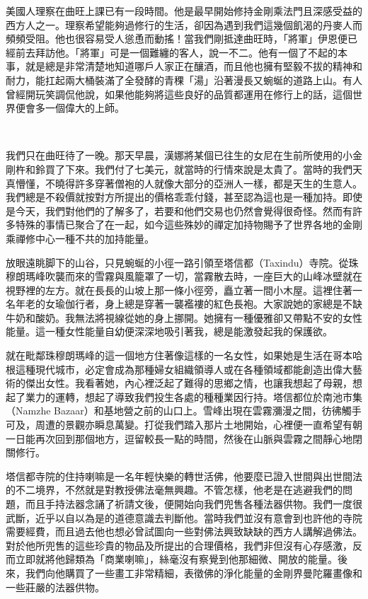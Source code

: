 美國人理察在曲旺上課已有一段時間。他是最早開始修持金剛乘法門且深感受益的西方人之一。理察希望能夠過修行的生活，卻因為遇到我們這幾個飢渴的丹麥人而頻頻受阻。他也很容易受人慫恿而動搖！當我們剛抵達曲旺時，「將軍」伊恩便已經前去拜訪他。「將軍」可是一個難纏的客人，說一不二。他有一個了不起的本事，就是總是非常清楚地知道哪戶人家正在釀酒，而且他也擁有堅毅不拔的精神和耐力，能扛起兩大桶裝滿了全發酵的青稞「湯」沿著漫長又蜿蜒的道路上山。有人曾經開玩笑調侃他說，如果他能夠將這些良好的品質都運用在修行上的話，這個世界便會多一個偉大的上師。

　

我們只在曲旺待了一晚。那天早晨，漢娜將某個已往生的女尼在生前所使用的小金剛杵和鈴買了下來。我們付了七美元，就當時的行情來說是太貴了。當時的我們天真懵懂，不曉得許多穿著僧袍的人就像大部分的亞洲人一樣，都是天生的生意人。我們總是不殺價就按對方所提出的價格乖乖付錢，甚至認為這也是一種加持。即使是今天，我們對他們的了解多了，若要和他們交易也仍然會覺得很奇怪。然而有許多特殊的事情已聚合了在一起，如今這些殊妙的禪定加持物賜予了世界各地的金剛乘禪修中心一種不共的加持能量。

放眼遠眺脚下的山谷，只見蜿蜒的小徑一路引領至塔信都（Taxindu）寺院。從珠穆朗瑪峰吹襲而來的雪霧與風籠罩了一切，當霧散去時，一座巨大的山峰冰壁就在視野裡的左方。就在長長的山坡上那一條小徑旁，矗立著一間小木屋。這裡住著一名年老的女瑜伽行者，身上總是穿著一襲襤褸的紅色長袍。大家說她的家總是不缺牛奶和酸奶。我無法將視線從她的身上挪開。她擁有一種優雅卻又帶點不安的女性能量。這一種女性能量自幼便深深地吸引著我，總是能激發起我的保護欲。

就在毗鄰珠穆朗瑪峰的這一個地方住著像這樣的一名女性，如果她是生活在哥本哈根這種現代城市，必定會成為那種婦女組織領導人或在各種領域都能創造出偉大藝術的傑出女性。我看著她，內心裡泛起了難得的思鄉之情，也讓我想起了母親，想起了業力的運轉，想起了導致我們投生各處的種種業因行持。塔信都位於南池市集（Namzhe
Bazaar）和基地營之前的山口上。雪峰出現在雲霧瀰漫之間，彷彿觸手可及，周遭的景觀亦瞬息萬變。打從我們踏入那片土地開始，心裡便一直希望有朝一日能再次回到那個地方，逗留較長一點的時間，然後在山脈與雲霧之間靜心地閉關修行。

塔信都寺院的住持喇嘛是一名年輕快樂的轉世活佛，他要麼已證入世間與出世間法的不二境界，不然就是對教授佛法毫無興趣。不管怎樣，他老是在逃避我們的問題，而且手持法器念誦了祈請文後，便開始向我們兜售各種法器供物。我們一度很武斷，近乎以自以為是的道德意識去判斷他。當時我們並沒有意會到也許他的寺院需要經費，而且過去他也想必曾試圖向一些對佛法興致缺缺的西方人講解過佛法。對於他所兜售的這些珍貴的物品及所提出的合理價格，我們非但沒有心存感激，反而立即就將他歸類為「商業喇嘛」，絲毫沒有察覺到他那細微、開放的能量。後來，我們向他購買了一些畫工非常精細，表徵佛的淨化能量的金剛界曼陀羅畫像和一些莊嚴的法器供物。


